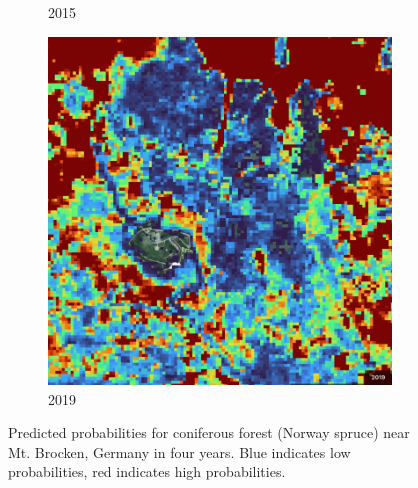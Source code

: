 \begin{figure}[H]
\begin{subfigure}[t]{0.24\textwidth}
        \caption{2015}
        \end{subfigure}
        \hfill
        \begin{subfigure}[t]{0.24\textwidth}
        \centering
        \includegraphics[width=\linewidth,height=\linewidth]{figs_06/brocken_2019.png}
        \caption{2019}
        \end{subfigure}
        \hfill
        \caption{Predicted probabilities for coniferous forest (Norway spruce) near Mt. Brocken, Germany in four years. Blue indicates low probabilities, red indicates high probabilities.}
        \label{fig:brocken_probabilities}
        \end{figure}

